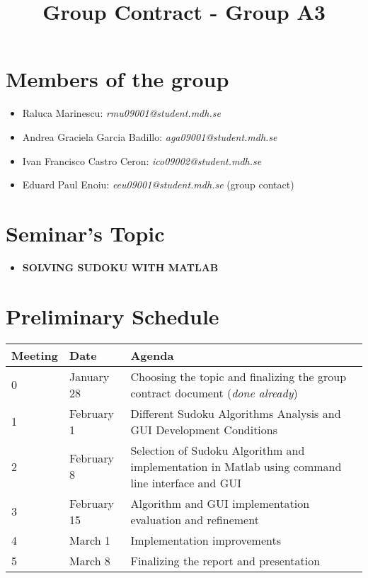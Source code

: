 \documentclass[12pt,a4paper]{article} %
\title{Group Contract - Group A3} %
\begin{document}
\maketitle %
\section{Members of the group}
 \begin{itemize}
\item Raluca Marinescu: \emph{rmu09001@student.mdh.se}
\item Andrea Graciela Garcia Badillo: \emph{aga09001@student.mdh.se}
\item Ivan Francisco Castro Ceron: \emph{ico09002@student.mdh.se}
\item Eduard Paul Enoiu: \emph{eeu09001@student.mdh.se} (group contact)
\end{itemize}

\section{Seminar's Topic}
 \begin{itemize}
\item \textbf{SOLVING SUDOKU WITH MATLAB}
\end{itemize}

\section{Preliminary Schedule}
\begin{center}
\begin{tabular}{ | l | l | p{8cm} |}
\hline
Meeting & Date & Agenda\\ \hline
0 & January 28 & Choosing the topic and finalizing the group contract document (\emph{done already}) \\ \hline
1 & February 1 & Different Sudoku Algorithms Analysis and GUI Development Conditions\\ \hline
2 & February 8 & Selection of Sudoku Algorithm and implementation in Matlab using command line interface and GUI  \\ \hline
3 & February 15 & Algorithm and GUI implementation evaluation and refinement \\ \hline
4 & March 1 & Implementation improvements \\ \hline
5 & March 8 & Finalizing the report and presentation \\ \hline
\end{tabular}
\end{center}
\end{document}
